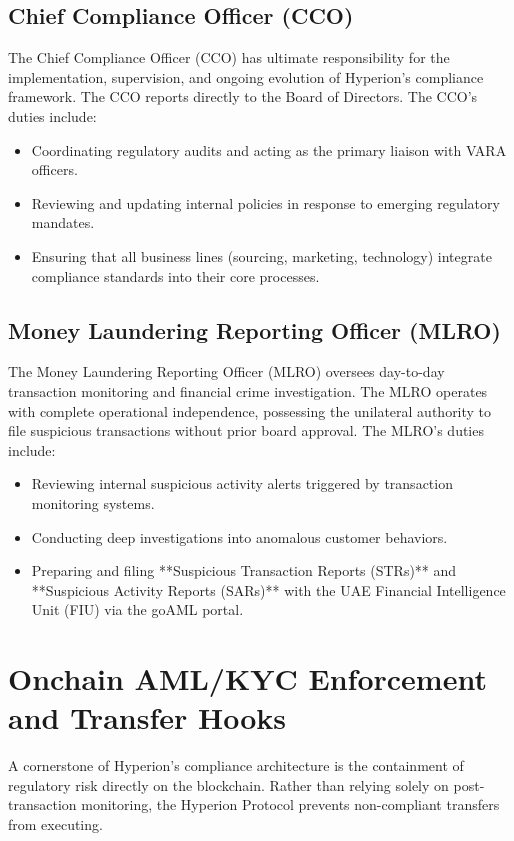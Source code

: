 \documentclass[11pt]{article}
\begin{document}
\subsection{Chief Compliance Officer (CCO)}
The Chief Compliance Officer (CCO) has ultimate responsibility for the implementation, supervision, and ongoing evolution of Hyperion's compliance framework. The CCO reports directly to the Board of Directors. The CCO's duties include:
\begin{itemize}
    \item Coordinating regulatory audits and acting as the primary liaison with VARA officers.
    \item Reviewing and updating internal policies in response to emerging regulatory mandates.
    \item Ensuring that all business lines (sourcing, marketing, technology) integrate compliance standards into their core processes.
\end{itemize}

\subsection{Money Laundering Reporting Officer (MLRO)}
The Money Laundering Reporting Officer (MLRO) oversees day-to-day transaction monitoring and financial crime investigation. The MLRO operates with complete operational independence, possessing the unilateral authority to file suspicious transactions without prior board approval. The MLRO's duties include:
\begin{itemize}
    \item Reviewing internal suspicious activity alerts triggered by transaction monitoring systems.
    \item Conducting deep investigations into anomalous customer behaviors.
    \item Preparing and filing **Suspicious Transaction Reports (STRs)** and **Suspicious Activity Reports (SARs)** with the UAE Financial Intelligence Unit (FIU) via the goAML portal.
\end{itemize}

\section{Onchain AML/KYC Enforcement and Transfer Hooks}
A cornerstone of Hyperion’s compliance architecture is the containment of regulatory risk directly on the blockchain. Rather than relying solely on post-transaction monitoring, the Hyperion Protocol prevents non-compliant transfers from executing.
\end{document}
